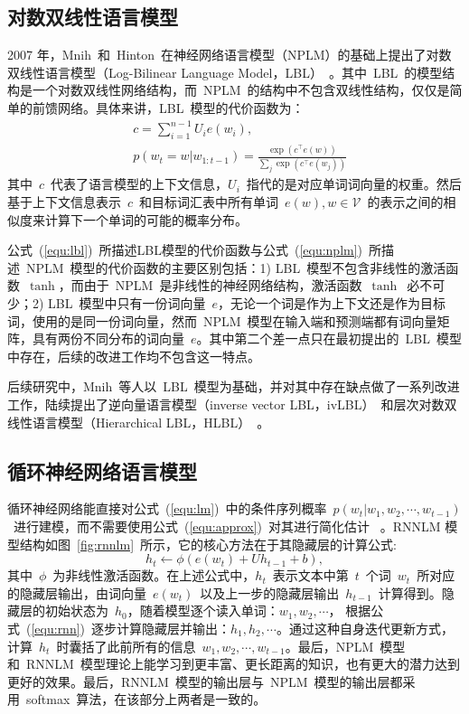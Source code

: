 \subsection{对数双线性语言模型}
2007 年，Mnih~和~Hinton~在神经网络语言模型（NPLM）的基础上提出了对数双线性语言模型（Log-Bilinear Language Model，LBL）~。其中~LBL~的模型结构是一个对数双线性网络结构，而~NPLM~的结构中不包含双线性结构，仅仅是简单的前馈网络。具体来讲，LBL~模型的代价函数为：
\begin{equation}
\label{equ:lbl}
\begin{split}
   &c=\sum_{i=1}^{n-1}{U_i e({w_i})}, \\
   &p(w_t=w|w_{1:t-1})=\frac{\exp(c^\top e(w))}{\sum_j{\exp(c^\top e(w_j))}}
\end{split}
\end{equation}
其中~$c$~代表了语言模型的上下文信息，$U_i$~指代的是对应单词词向量的权重。然后基于上下文信息表示~$c$~和目标词汇表中所有单词~$e(w),w\in \mathcal{V}$~的表示之间的相似度来计算下一个单词的可能的概率分布。

公式~(\ref{equ:lbl})~所描述LBL模型的代价函数与公式~(\ref{equ:nplm})~所描述~NPLM~模型的代价函数的主要区别包括：1) LBL~模型不包含非线性的激活函数~$\tanh$，而由于~NPLM~是非线性的神经网络结构，激活函数~$\tanh$~必不可少；2) LBL~模型中只有一份词向量~$e$，无论一个词是作为上下文还是作为目标词，使用的是同一份词向量，然而~NPLM~模型在输入端和预测端都有词向量矩阵，具有两份不同分布的词向量~$e$。其中第二个差一点只在最初提出的~LBL~模型中存在，后续的改进工作均不包含这一特点。

后续研究中，Mnih~等人以~LBL~模型为基础，并对其中存在缺点做了一系列改进工作，陆续提出了逆向量语言模型（inverse vector LBL，ivLBL）~和层次对数双线性语言模型（Hierarchical LBL，HLBL）~。

\subsection{循环神经网络语言模型}
循环神经网络能直接对公式~(\ref{equ:lm})~中的条件序列概率~$p(w_t| w_1,w_2,\cdots,w_{t-1})$~进行建模，而不需要使用公式~(\ref{equ:approx})~对其进行简化估计~ 。RNNLM 模型结构如图~\ref{fig:rnnlm}~所示，它的核心方法在于其隐藏层的计算公式:
\begin{equation}
\label{equ:rnn}
  h_t \leftarrow  \phi(e(w_t) + U h_{t-1} +b),
\end{equation}
其中~$\phi$~为非线性激活函数。在上述公式中，$h_t$~表示文本中第~$t$~个词~$w_t$~所对应的隐藏层输出，由词向量~$e(w_t)$~以及上一步的隐藏层输出~$h_{t -1}$~计算得到。隐藏层的初始状态为~$h_0$，随着模型逐个读入单词：$w_1,w_2,\cdots$， 根据公式~(\ref{equ:rnn})~逐步计算隐藏层并输出：$h_1,h_2,\cdots$。通过这种自身迭代更新方式，计算~$h_t$~时囊括了此前所有的信息~$w_1,w_2,\cdots,w_{t-1}$。最后，NPLM~模型和~RNNLM~模型理论上能学习到更丰富、更长距离的知识，也有更大的潜力达到更好的效果。最后，RNNLM~模型的输出层与~NPLM~模型的输出层都采用~softmax~算法，在该部分上两者是一致的。

